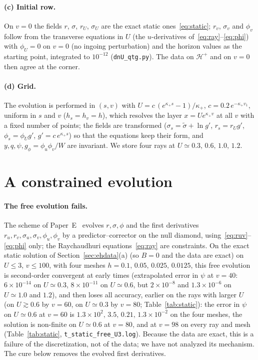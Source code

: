 \documentclass[11pt]{article}
\begin{document}
\paragraph{(c) Initial row.} On $v=0$ the fields $r$, $\sigma$, $r_U$, $\sigma_U$ are the exact static ones~\eqref{eq:static}; $r_v$, $\sigma_v$ and $\phi_v$ follow from the transverse equations in $U$ (the $u$-derivatives of~\eqref{eq:ray}--\eqref{eq:phi}) with $\phi_U=0$ on $v=0$ (no ingoing perturbation) and the horizon values as the starting point, integrated to $10^{-12}$ (\texttt{dnU\_qtg.py}). The data on $\mathcal H^{+}$ and on $v=0$ then agree at the corner.

\paragraph{(d) Grid.} The evolution is performed in $(s,v)$ with $U=c\,(e^{\kappa_+s}-1)/\kappa_+$, $c=0.2\,e^{-\kappa_+v_1}$, uniform in $s$ and $v$ ($h_s=h_v=h$), which resolves the layer $x=Ue^{\kappa_+v}$ at all $v$ with a fixed number of points; the fields are transformed ($\sigma_s=\tilde\sigma+\ln g'$, $r_s=r_Ug'$, $\phi_s=\phi_Ug'$, $g'=c\,e^{\kappa_+s}$) so that the equations keep their form, and $y,q,\psi,g_\phi=\phi_u\phi_v/W$ are invariant. We store four rays at $U\simeq0.3,\,0.6,\,1.0,\,1.2$.

\section{A constrained evolution}
\label{sec:cy}

\paragraph{The free evolution fails.} The scheme of Paper~E~\citep{PaperE} evolves $r,\sigma,\phi$ and the first derivatives $r_u,r_v,\sigma_u,\sigma_v,\phi_u,\phi_v$ by a predictor--corrector on the null diamond, using~\eqref{eq:ruv}--\eqref{eq:phi} only; the Raychaudhuri equations~\eqref{eq:ray} are constraints. On the exact static solution of Section~\ref{sec:ehdata}(a) (so $B=0$ and the data are exact) on $U\le3$, $v\le100$, with four meshes $h=0.1,\,0.05,\,0.025,\,0.0125$, this free evolution is second-order convergent at early times (extrapolated error in $\psi$ at $v=40$: $6\times10^{-14}$ on $U\simeq0.3$, $8\times10^{-11}$ on $U\simeq0.6$, but $2\times10^{-8}$ and $1.3\times10^{-6}$ on $U\simeq1.0$ and $1.2$), and then loses all accuracy, earlier on the rays with larger $U$ (on $U\gtrsim0.6$ by $v=60$, on $U\simeq0.3$ by $v=80$; Table~\ref{tab:static}): the error in $\psi$ on $U\simeq0.6$ at $v=60$ is $1.3\times10^{2},\,3.5,\,0.21,\,1.3\times10^{-2}$ on the four meshes, the solution is non-finite on $U\simeq0.6$ at $v=80$, and at $v=98$ on every ray and mesh (Table~\ref{tab:static}, \texttt{t\_static\_free\_U3.log}). Because the data are exact, this is a failure of the discretization, not of the data; we have not analyzed its mechanism. The cure below removes the evolved first derivatives.
\end{document}

